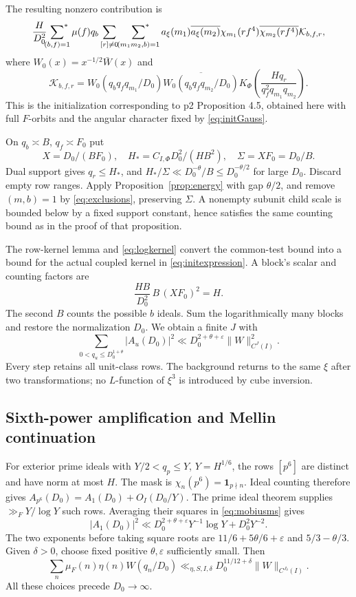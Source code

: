 \documentclass[11pt,a4paper]{article}
\numberwithin{equation}{section}
\theoremstyle{definition}
\theoremstyle{remark}
\newcommand{\ind}{\mathbf1}
\newcommand{\sfstar}{\sideset{}{^*}\sum}
\newcommand{\eps}{\varepsilon}
\begin{document}
The resulting nonzero contribution is
\begin{equation}\label{eq:initexpression}
 \frac H{D_0^2}\sfstar_{(b,f)=1}\mu(f)q_b
 \sum_{[r]\ne0}\sfstar_{(m_1m_2,b)=1}
 a_\xi(m_1)\overline{a_\xi(m_2)}
 \chi_{m_1}(rf^4)\overline{\chi_{m_2}(rf^4)}
                          \mathcal K_{b,f,r},
\end{equation}
where $W_0(x)=x^{-1/2}\bar W(x)$ and
\[
 \mathcal K_{b,f,r}
 =W_0(q_bq_fq_{m_1}/D_0)\overline{W_0(q_bq_fq_{m_2}/D_0)}
       K_\Phi\left(\frac{Hq_r}{q_f^2q_{m_1}q_{m_2}}\right).
\]
This is the initialization corresponding to p2 Proposition 4.5, obtained here with full $F$-orbits and the angular character fixed by \eqref{eq:initGauss}.

On $q_b\asymp B$, $q_f\asymp F_0$ put
\[
 X=D_0/(BF_0),\quad H_*=C_{I,\Phi}D_0^2/(HB^2),\quad
 \Sigma=XF_0=D_0/B.
\]
Dual support gives $q_r\le H_*$, and
$H_*/\Sigma\ll D_0^{-\theta}/B\le D_0^{-\theta/2}$
for large $D_0$. Discard empty row ranges. Apply Proposition~\ref{prop:energy} with gap $\theta/2$, and remove $(m,b)=1$ by \eqref{eq:exclusions}, preserving $\Sigma$. A nonempty subunit child scale is bounded below by a fixed support constant, hence satisfies the same counting bound as in the proof of that proposition.

The row-kernel lemma and \eqref{eq:logkernel} convert the common-test bound into a bound for the actual coupled kernel in \eqref{eq:initexpression}. A block's scalar and counting factors are
\[
 \frac{HB}{D_0^2}\,B\,(XF_0)^2=H.
\]
The second $B$ counts the possible $b$ ideals. Sum the logarithmically many blocks and restore the normalization $D_0$. We obtain a finite $J$ with
\begin{equation}\label{eq:mobiusms}
 \sum_{0<q_u\le D_0^{1+\theta}}|A_u(D_0)|^2
       \ll D_0^{2+\theta+\eps}\|W\|_{C^J(I)}^2.
\end{equation}
Every step retains all unit-class rows. The background returns to the same $\xi$ after two transformations; no $L$-function of $\xi^3$ is introduced by cube inversion.

\subsection{Sixth-power amplification and Mellin continuation}\label{sec:amplification}
For exterior prime ideals with $Y/2<q_p\le Y$, $Y=H^{1/6}$, the rows $[p^6]$ are distinct and have norm at most $H$. The mask is
$\chi_n(p^6)=\ind_{p\nmid n}$. Ideal counting therefore gives
$A_{p^6}(D_0)=A_1(D_0)+O_I(D_0/Y)$.
The prime ideal theorem supplies $\gg_F Y/\log Y$ such rows. Averaging their squares in \eqref{eq:mobiusms} gives
\[
 |A_1(D_0)|^2
 \ll D_0^{2+\theta+\eps}Y^{-1}\log Y+D_0^2Y^{-2}.
\]
The two exponents before taking square roots are
$11/6+5\theta/6+\eps$ and $5/3-\theta/3$. Given $\delta>0$, choose fixed positive $\theta,\eps$ sufficiently small. Then
\begin{equation}\label{eq:mobiuspower}
 \sum_n\mu_F(n)\eta(n)W(q_n/D_0)
       \ll_{\eta,S,I,\delta}
          D_0^{11/12+\delta}\|W\|_{C^{J_\delta}(I)}.
\end{equation}
All these choices precede $D_0\to\infty$.
\end{document}

